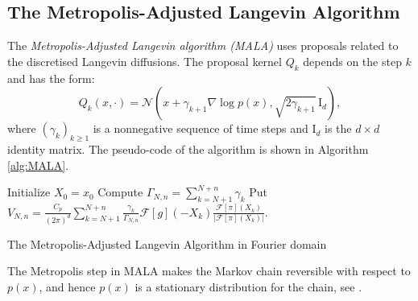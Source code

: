\documentclass[preprint, 3p, authoryear]{elsarticle}
\newcommand{\Id}{\mathrm{I}}
\theoremstyle{definition}
\begin{document}
\subsection{The Metropolis-Adjusted Langevin Algorithm}
The \textit{Metropolis-Adjusted Langevin algorithm (MALA)} uses   proposals related to the discretised Langevin diffusions.
The proposal kernel
$Q_k$ depends on the step $k$ and has  the form:
\[
	Q_k(x,\cdot) = \mathcal{N}\left(x + \gamma_{k+1} \nabla \log p(x),\sqrt{2\gamma_{k+1}}\, \Id_d\right),
\]
where $(\gamma_k)_{k\ge1}$ is a nonnegative sequence of time steps and $\Id_d$ is the $d\times d$ identity matrix.
The pseudo-code of the algorithm is shown in Algorithm \ref{alg:MALA}.
\begin{center}
\begin{algorithm}[H]
 Initialize $X_0 = x_0$\;
 Compute $\Gamma_{N,n} = \sum_{k=N+1}^{N+n} \gamma_k$\;
 Put  $V_{N,n}=\displaystyle\frac{C_{p}}{(2\pi)^d}\sum_{k=N+1}^{N+n} \frac{\gamma_k}{\Gamma_{N,n}} \mathcal{F}[g](-X_k)\frac{\mathcal{F}[\pi](X_k)}{|\mathcal{F}[\pi](X_k)|}.$
\caption{The Metropolis-Adjusted Langevin Algorithm in Fourier domain}\label{alg:MALA}
\end{algorithm}
\end{center}
\par

The Metropolis step in MALA makes the Markov chain %
reversible with respect to
$p(x)$, and hence $p(x)$ is a stationary distribution for the chain, see \citet{metropolis1953equation}.
\end{document}
